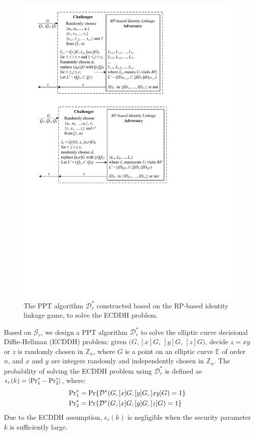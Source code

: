 {{{\begin{figure}[tb]
  \centering
  \includegraphics[width=0.99\linewidth]{fig/dalgorithm-lemma2.pdf}
  \caption{The PPT algorithm $\mathcal{D}^*_r$ constructed based on the RP-based identity linkage game, to solve the ECDDH problem.}
  \label{fig:dalgorithm}
\end{figure}

Based on $\mathcal{G}_r$, we design a PPT algorithm $\mathcal{D}^*_r$ to solve the elliptic curve decisional Diffie-Hellman (ECDDH) problem:
 given $(G, [x]G$, $[y]G$, $[z]G)$, decide $z = xy$ or $z$ is randomly chosen in $\mathbb{Z}_n$,
    where $G$ is a point on an elliptic curve $\mathbb{E}$ of order $n$, and $x$ and $y$ are integers randomly and independently chosen in $\mathbb{Z}_n$.
The probability of solving the ECDDH problem using $\mathcal{D}^*_r$ is defined as $\epsilon_{r}(k) = |{\rm Pr}^*_1 - {\rm Pr}^*_2|$, where:
\begin{align*}
&{\rm Pr}^*_1 =  {\rm Pr}\{\mathcal{D}^*(G, [x]G, [y]G, [xy]G)=1\} \\
&{\rm Pr}^*_2 =  {\rm Pr}\{\mathcal{D}^*(G, [x]G, [y]G, [z]G)=1\}
\end{align*}
Due to the ECDDH assumption,
    $\epsilon_{r}(k)$ is negligible when the security parameter $k$ is sufficiently large.

}}}
